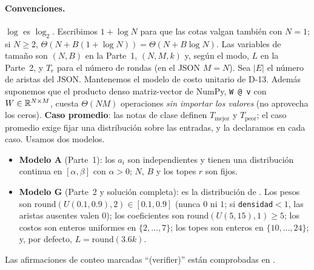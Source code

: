 \paragraph{Convenciones.} $\log$ es $\log_2$. Escribimos $1+\log N$ para que las cotas valgan también con $N=1$; si $N\ge2$, $\Theta(N+B(1+\log N))=\Theta(N+B\log N)$. Las variables de tamaño son $(N,B)$ en la Parte~1, $(N,M,k)$ y, según el modo, $L$ en la Parte~2, y $T_r$ para el número de rondas (en el JSON $M=N$). Sea $|E|$ el número de aristas del JSON. Mantenemos el modelo de costo unitario de D-13. Además suponemos que el producto denso matriz-vector de NumPy, \texttt{W @ v} con $W\in\mathbb{R}^{N\times M}$, cuesta $\Theta(NM)$ operaciones \emph{sin importar los valores} (no aprovecha los ceros). \textbf{Caso promedio}: las notas de clase definen $T_{\text{mejor}}$ y $T_{\text{peor}}$; el caso promedio exige fijar una distribución sobre las entradas, y la declaramos en cada caso. Usamos dos modelos.
\begin{itemize}[nosep]
\item \textbf{Modelo A} (Parte~1): los $a_i$ son independientes y tienen una distribución continua en $[\alpha,\beta]$ con $\alpha>0$; $N$, $B$ y los topes $r$ son fijos.
\item \textbf{Modelo G} (Parte~2 y solución completa): es la distribución de . Los pesos son $\mathrm{round}(U(0.1,0.9),2)\in[0.1,0.9]$ (nunca $0$ ni $1$; si \texttt{densidad}$<1$, las aristas ausentes valen $0$); los coeficientes son $\mathrm{round}(U(5,15),1)\ge5$; los costos son enteros uniformes en $\{2,\dots,7\}$; los topes son enteros en $\{10,\dots,24\}$; y, por defecto, $L=\mathrm{round}(3.6k)$.
\end{itemize}
Las afirmaciones de conteo marcadas ``(verifier)'' están comprobadas en .

